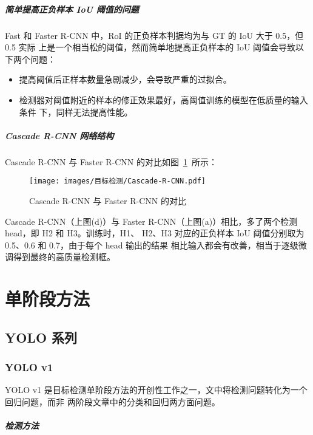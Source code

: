 \paragraph{简单提高正负样本 IoU 阈值的问题}
Fast 和 Faster R-CNN 中，RoI 的正负样本判据均为与 GT 的 IoU 大于 0.5，但 0.5 实际
上是一个相当松的阈值，然而简单地提高正负样本的 IoU 阈值会导致以下两个问题：

\begin{itemize}
  \item 提高阈值后正样本数量急剧减少，会导致严重的过拟合。
  \item 检测器对阈值附近的样本的修正效果最好，高阈值训练的模型在低质量的输入条件
    下，同样无法提高性能。
\end{itemize}

\paragraph{Cascade R-CNN 网络结构}
Cascade R-CNN 与 Faster R-CNN 的对比如图~\ref{fig:Cascade-RCNN}~所示：

\begin{figure}[ht]
  \centering
  \texttt{[image: images/目标检测/Cascade-R-CNN.pdf]}
  \caption{Cascade R-CNN 与 Faster R-CNN 的对比}
  \label{fig:Cascade-RCNN}
\end{figure}

Cascade R-CNN（上图(d)）与 Faster R-CNN（上图(a)）相比，多了两个检测 head，即 H2 和 H3。训练时，H1、
H2、H3 对应的正负样本 IoU 阈值分别取为 0.5、0.6 和 0.7，由于每个 head 输出的结果
相比输入都会有改善，相当于逐级微调得到最终的高质量检测框。

\chapter{单阶段方法}

\section{YOLO 系列}
\label{sec:YOLO}

\subsection{YOLO v1}
\label{subsec:YOLOv1}
YOLO v1 是目标检测单阶段方法的开创性工作之一，文中将检测问题转化为一个回归问题，而非
两阶段文章中的分类和回归两方面问题。

\paragraph{检测方法}

